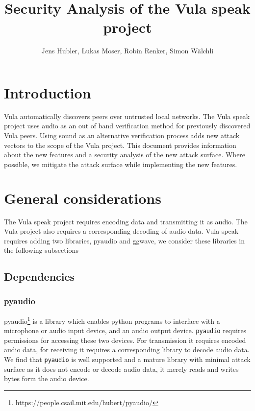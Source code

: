\documentclass[a4paper,11pt]{report}
\title{Security Analysis of the Vula speak project}
\author{Jens Hubler, Lukas Moser, Robin Renker, Simon Wälchli}
\begin{document}
\maketitle
\tableofcontents

\chapter{Introduction}
Vula automatically discovers peers over untrusted local networks. The Vula speak project uses audio as an out of band verification method for previously discovered Vula peers.
Using sound as an alternative verification process adds new attack vectors to the scope of the Vula project. This document provides information about the new features and a security analysis of the new attack surface. Where possible, we mitigate the attack surface while implementing the new features. 

\chapter{General considerations}
The Vula speak project requires encoding data and transmitting it as audio. The Vula project also requires a corresponding decoding of audio data. Vula speak requires adding two libraries, pyaudio and ggwave, we consider these libraries in the following subsections
\section{Dependencies}
\subsection{pyaudio}
pyaudio\footnote[0]{https://people.csail.mit.edu/hubert/pyaudio/} is a library which enables python programs to interface with a microphone or audio input device, and an audio output device. \texttt{pyaudio} requires permissions for accessing these two devices. For transmission it requires encoded audio data, for receiving it requires a corresponding library to decode audio data. We find that \texttt{pyaudio} is well supported and a mature library with minimal attack surface as it does not encode or decode audio data, it merely reads and writes bytes form the audio device.
\end{document}

